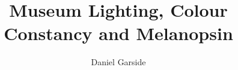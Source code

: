 
\renewcommand{\bibname}{References}

\title{Museum Lighting, Colour Constancy and Melanopsin}
\author{Daniel Garside}

\maketitle
\makedeclaration

%
%
%

\setcounter{tocdepth}{2} 

\tableofcontents
\printglossary[type=\acronymtype,style=long]
\glsresetall %

